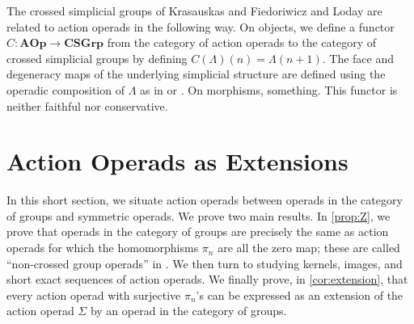 
\begin{rem}\label{rem:crossed}
The crossed simplicial groups of Krasauskas \cite{Kra87} and Fiedoriwicz and Loday \cite{FL91} are related to action operads in the following way. 
On objects, we define a functor $C \colon \mathbf{AOp} \rightarrow \mathbf{CSGrp}$ from the category of action operads to the category of crossed simplicial groups by defining $C(\Lambda)(n) = \Lambda(n+1)$. 
The face and degeneracy maps of the underlying simplicial structure are defined using the operadic composition of $\Lambda$ as in \cite[Construction~1.1]{Kra96} or \cite[Section~2]{ber-simplicial}. 
On morphisms, something.
This functor is neither faithful nor conservative.
\end{rem}




\section{Action Operads as Extensions}

In this short section, we situate action operads between operads in the category of groups and symmetric operads.
We prove two main results.
In \cref{prop:Z}, we prove that operads in the category of groups are precisely the same as action operads for which the homomorphisms $\pi_n$ are all the zero map; these are called ``non-crossed group operads'' in \cite{zhang-grp}.
We then turn to studying kernels, images, and short exact sequences of action operads.
We finally prove, in \cref{cor:extension}, that every action operad with surjective $\pi_n$'s can be expressed as an extension of the action operad $\Sigma$ by an operad in the category of groups.

